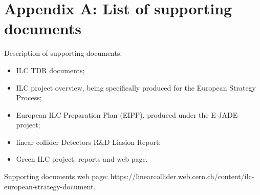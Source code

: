 \documentclass[%
 reprint,
 floatfix,
 amsmath,amssymb,
 aps,
]{revtex4-1}
\begin{document}

\section*{\label{Appendix3} \Large{Appendix A: List of supporting documents} }
Description of supporting documents:
\begin{itemize}
\item
ILC TDR documents;
\item
ILC project overview, being specifically produced for the European Strategy Process;
\item
European ILC Preparation Plan (EIPP), produced under the E-JADE project;
\item
linear collider Detectors R\&D Liasion Report;
\item
Green ILC project: reports and web page.

\end{itemize}

Supporting documents web page: https://linearcollider.web.cern.ch/content/ilc-european-strategy-document.
\end{document}
